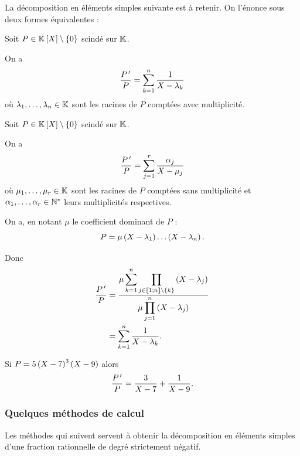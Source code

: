 \begin{rem}
La décomposition en éléments simples suivante est à retenir. On l'énonce sous deux formes équivalentes :
\end{rem}

\begin{prop}
Soit \(P\in\poly\excluant\accol{0}\) scindé sur \(\mathbb{K}\).

On a \[\dfrac{P^{\,\prime}}{P}=\sum_{k=1}^n\dfrac{1}{X-\lambda_k}\] où \(\lambda_1,\dots,\lambda_n\in\mathbb{K}\) sont les racines de \(P\) comptées avec multiplicité.
\end{prop}

\begin{prop}
Soit \(P\in\poly\excluant\accol{0}\) scindé sur \(\mathbb{K}\).

On a \[\dfrac{P^{\,\prime}}{P}=\sum_{j=1}^r\dfrac{\alpha_j}{X-\mu_j}\] où \(\mu_1,\dots,\mu_r\in\mathbb{K}\) sont les racines de \(P\) comptées sans multiplicité et \(\alpha_1,\dots,\alpha_r\in\mathbb{N}^*\) leurs multiplicités respectives.
\end{prop}

\begin{dem}
On a, en notant \(\mu\) le coefficient dominant de \(P\) : \[P=\mu\left(X-\lambda_1\right)\dots\left(X-\lambda_n\right).\]

Donc \[\begin{aligned}
\dfrac{P^{\,\prime}}{P}&=\dfrac{\mu\displaystyle\sum_{k=1}^n\prod_{j\in\left\llbracket1;n\right\rrbracket\setminus\left\lbrace k\right\rbrace}\left(X-\lambda_j\right)}{\mu\displaystyle\prod_{j=1}^n\left(X-\lambda_j\right)} \\
&=\sum_{k=1}^n\dfrac{1}{X-\lambda_k}.
\end{aligned}\]
\end{dem}

\begin{ex}
Si \(P=5\left(X-7\right)^3\left(X-9\right)\) alors \[\dfrac{P^{\,\prime}}{P}=\dfrac{3}{X-7}+\dfrac{1}{X-9}.\]
\end{ex}

\subsubsection{Quelques méthodes de calcul}

\begin{rem}
Les méthodes qui suivent servent à obtenir la décomposition en éléments simples d'une fraction rationnelle de degré strictement négatif.
\end{rem}

